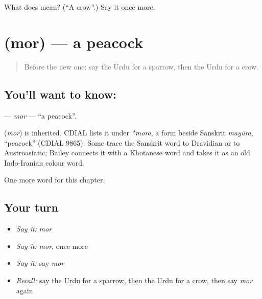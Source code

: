 \begin{tcolorbox}[breakable,colback=teal!4,colframe=teal!35!black,title={Before you move on}]
What does  mean? (\textquotedblleft{}A crow\textquotedblright{}.) Say it once more.
\end{tcolorbox}
\section[\texorpdfstring{\ur{مور} (mor)}{مور (mor)}]{ (mor) — a peacock}

\label{lesson:UR-C126-mor2}



\begin{quote}
Before the new one: say the Urdu for a sparrow, then the Urdu for a crow.
\end{quote}

\subsection*{You'll want to know: }
\textbf{} — \emph{mor} — \textquotedblleft{}a peacock\textquotedblright{}.

\begin{cousinweb}
\textbf{} (\emph{mor}) is inherited. CDIAL lists it under \emph{*mora}, a form beside Sanskrit \emph{mayūra}, \textquotedblleft{}peacock\textquotedblright{} (CDIAL 9865). Some trace the Sanskrit word to Dravidian or to Austroasiatic; Bailey connects it with a Khotanese word and takes it as an old Indo-Iranian colour word.
\end{cousinweb}

\begin{grammarlens}[title={What you've built}]
One more word for this chapter.
\end{grammarlens}

\subsection*{Your turn}
\begin{itemize}
\raggedright
  \item \emph{Say it:} \emph{mor}
  \item \emph{Say it:} \emph{mor}, once more
  \item \emph{Say it:} say \emph{mor}
  \item \emph{Recall:} say the Urdu for a sparrow, then the Urdu for a crow, then say \emph{mor} again
\end{itemize}

